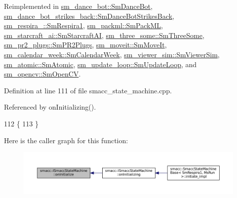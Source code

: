 Reimplemented in \hyperlink{structsm__dance__bot_1_1SmDanceBot_a1baf6710e3e4755483e1e8441bb0f910}{sm\+\_\+dance\+\_\+bot\+::\+Sm\+Dance\+Bot}, \hyperlink{structsm__dance__bot__strikes__back_1_1SmDanceBotStrikesBack_ad6a9ef45cc05cb6fed4550f2f04d4a3e}{sm\+\_\+dance\+\_\+bot\+\_\+strikes\+\_\+back\+::\+Sm\+Dance\+Bot\+Strikes\+Back}, \hyperlink{structsm__respira__1_1_1SmRespira1_a6be26eb018ef73a2e39772fe4a03e551}{sm\+\_\+respira\+\_\+::\+Sm\+Respira1}, \hyperlink{structsm__packml_1_1SmPackML_a977b226f0602ce502cd3678f9066a450}{sm\+\_\+packml\+::\+Sm\+Pack\+ML}, \hyperlink{structsm__starcraft__ai_1_1SmStarcraftAI_a16d8896df860ce9098a7eb7ccce90a4c}{sm\+\_\+starcraft\+\_\+ai\+::\+Sm\+Starcraft\+AI}, \hyperlink{structsm__three__some_1_1SmThreeSome_ac811ac731023ccbab1db358d0efa1c0e}{sm\+\_\+three\+\_\+some\+::\+Sm\+Three\+Some}, \hyperlink{structsm__pr2__plugs_1_1SmPR2Plugs_acfafd0eeb3863f00a79704f656d4f4c6}{sm\+\_\+pr2\+\_\+plugs\+::\+Sm\+P\+R2\+Plugs}, \hyperlink{structsm__moveit_1_1SmMoveIt_af2af89c1cb101214c2925b0818d74be5}{sm\+\_\+moveit\+::\+Sm\+Move\+It}, \hyperlink{structsm__calendar__week_1_1SmCalendarWeek_a4c01af9a3190d10d3794e82bd087e121}{sm\+\_\+calendar\+\_\+week\+::\+Sm\+Calendar\+Week}, \hyperlink{structsm__viewer__sim_1_1SmViewerSim_a1ad4e963a078af53a55097c6eb78cae0}{sm\+\_\+viewer\+\_\+sim\+::\+Sm\+Viewer\+Sim}, \hyperlink{structsm__atomic_1_1SmAtomic_ac87a3d5a78eb48b949b3948f9ce28d24}{sm\+\_\+atomic\+::\+Sm\+Atomic}, \hyperlink{structsm__update__loop_1_1SmUpdateLoop_a7434ac83f9a7a1732b5814cb307522a6}{sm\+\_\+update\+\_\+loop\+::\+Sm\+Update\+Loop}, and \hyperlink{structsm__opencv_1_1SmOpenCV_ae32fcae433bed3e834b5860bb0046eb4}{sm\+\_\+opencv\+::\+Sm\+Open\+CV}.



Definition at line 111 of file smacc\+\_\+state\+\_\+machine.\+cpp.



Referenced by on\+Initializing().


\begin{DoxyCode}
112 \{
113 \}
\end{DoxyCode}
Here is the caller graph for this function\+:
\nopagebreak
\begin{figure}[H]
\begin{center}
\leavevmode
\includegraphics[width=350pt]{classsmacc_1_1ISmaccStateMachine_ac2982c6c8283663e5e1e8a7c82f511ec_icgraph}
\end{center}
\end{figure}
\mbox{\label{classsmacc_1_1ISmaccStateMachine_a95e7f71d0d88fffd0afebb1f9ccdade5}} 
